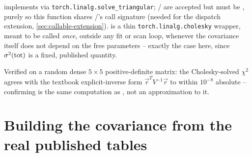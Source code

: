 \begin{implbox}
 implements
 via \texttt{torch.linalg.solve\_triangular};
/ are accepted but must be
, purely so this function shares
/'s call signature (needed
for the dispatch extension, \cref{sec:callable-extension}).
 is a thin
\texttt{torch.linalg.cholesky} wrapper, meant to be called \emph{once},
outside any fit or scan loop, whenever the covariance itself does not
depend on the free parameters -- exactly the case here, since
$\sigma^2({\rm tot})$ is a fixed, published quantity.
\end{implbox}

\begin{resultbox}
Verified on a random dense $5\times5$ positive-definite matrix: the
Cholesky-solved $\chi^2$ agrees with the textbook explicit-inverse form
$\vec r^T V^{-1}\vec r$ to within $10^{-8}$ absolute -- confirming
 is the same computation as
, not an approximation to it.
\end{resultbox}

\section{Building the covariance from the real published tables}
\label{sec:covariance-construction}


